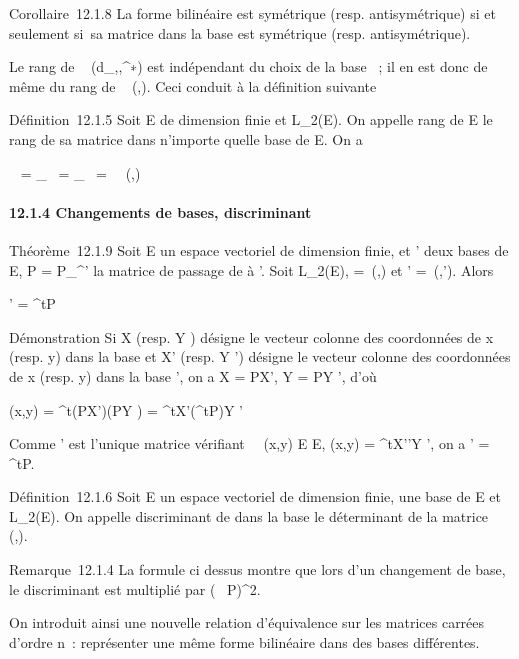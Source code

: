 \documentclass[]{article}
\begin{document}
Corollaire~12.1.8 La forme bilinéaire \phi est symétrique (resp.
antisymétrique) si et seulement si~sa matrice dans la base  est
symétrique (resp. antisymétrique).

Le rang de \mathrmMat~
(d_\phi,,^∗) est indépendant du choix de la base ~;
il en est donc de même du rang de
\mathrmMat~ (\phi,). Ceci
conduit à la définition suivante

Définition~12.1.5 Soit E de dimension finie et \phi \in L_2(E). On
appelle rang de E le rang de sa matrice dans n'importe quelle base de E.
On a

\mathrmrg~\phi
= \mathrmrgd_\phi~
= \mathrmrgg_\phi~
=\
\mathrmrg\mathrmMat~
(\phi,)

\paragraph{12.1.4 Changements de bases, discriminant}

Théorème~12.1.9 Soit E un espace vectoriel de dimension finie,  et '
deux bases de E, P = P_\mathcal{E}^\mathcal{E}' la matrice de passage de  à
\mathcal{E}'. Soit \phi \in L_2(E), \Omega =\
\mathrmMat (\phi,) et \Omega' =\
\mathrmMat (\phi,\mathcal{E}'). Alors

\Omega' = ^tP\OmegaP

Démonstration Si X (resp. Y ) désigne le vecteur colonne des coordonnées
de x (resp. y) dans la base  et X' (resp. Y ') désigne le vecteur
colonne des coordonnées de x (resp. y) dans la base ', on a X = PX', Y
= PY ', d'où

\phi(x,y) = ^t(PX')\Omega(PY ) = ^tX'(^tP\OmegaP)Y '

Comme \Omega' est l'unique matrice vérifiant \forall~~(x,y)
\in E \times E, \phi(x,y) = ^tX'\Omega'Y ', on a \Omega' = ^tP\OmegaP.

Définition~12.1.6 Soit E un espace vectoriel de dimension finie,  une
base de E et \phi \in L_2(E). On appelle discriminant de \phi dans la
base  le déterminant de la matrice
\mathrmMat~ (\phi,\mathcal{E}).

Remarque~12.1.4 La formule ci dessus montre que lors d'un changement de
base, le discriminant est multiplié par
(~
P)^2.

On introduit ainsi une nouvelle relation d'équivalence sur les matrices
carrées d'ordre n~: représenter une même forme bilinéaire dans des bases
différentes.
\end{document}
